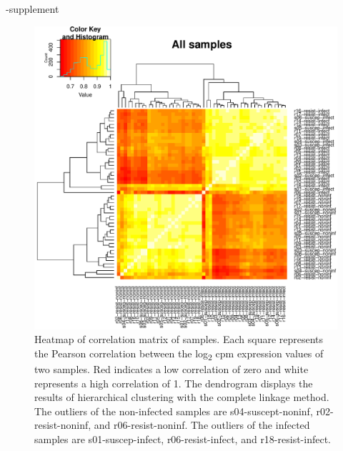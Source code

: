 \documentclass[fleqn,10pt]{wlscirep}
\begin{document}
\begin{filecontents}{\jobname-supplement}
\begin{figure}[ht]
\centering
\includegraphics[width=\linewidth]{../figure/heatmap-all-samples.pdf}
\caption{
Heatmap of correlation matrix of samples. Each square represents the
Pearson correlation between the log\textsubscript{2} cpm expression
values of two samples. Red indicates a low correlation of zero and
white represents a high correlation of 1. The dendrogram displays the
results of hierarchical clustering with the complete linkage method.
The outliers of the non-infected samples are s04-suscept-noninf,
r02-resist-noninf, and r06-resist-noninf. The outliers of the infected
samples are s01-suscep-infect, r06-resist-infect, and
r18-resist-infect.
}
\label{fig:heat-all}
\end{figure}


\end{filecontents}
\end{document}

